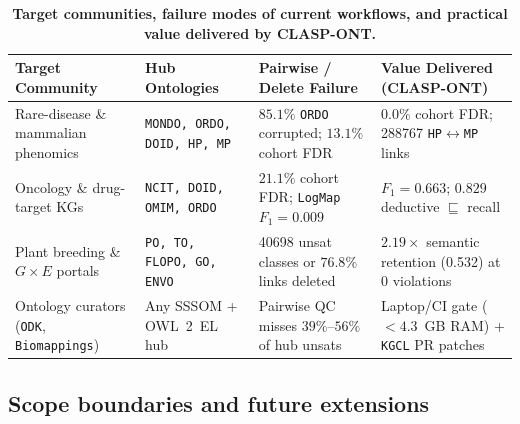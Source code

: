 \documentclass[10pt]{article}
\theoremstyle{accentdef}
\newcommand{\ClaspDiseasePhenotypeHubBRawHubORDOCorruptedPct}{85.1}
\newcommand{\ClaspDiseasePhenotypeHubBLexicalLatticeHPMPPairs}{288767}
\newcommand{\ClaspDiseasePhenotypeHubBRawHubChapterFDRPct}{13.1}
\newcommand{\ClaspOAEIBioMLBRawHubChapterFDRPct}{21.1}
\newcommand{\ClaspOAEIBioMLBLogMapRepairEquivFone}{0.009}
\newcommand{\ClaspOAEIBioMLBLexicalLatticeEquivFone}{0.663}
\newcommand{\ClaspOAEIBioMLBLexicalLatticeDedSubRecall}{0.829}
\newcommand{\ClaspPlantBiodivHubRawUnsat}{40698}
\newcommand{\ClaspPlantBiodivHubBLexicalLatticeRetention}{0.532}
\begin{document}
\begin{table}[t]
\centering
\caption{\textbf{Target communities, failure modes of current workflows, and practical value delivered by \textsc{CLASP-ONT}.}}
\label{tab:stakeholders}
\footnotesize
\setlength{\tabcolsep}{4.8pt}
\begin{tabularx}{\textwidth}{@{}>{\raggedright\arraybackslash}p{3.4cm}>{\raggedright\arraybackslash}p{2.9cm}>{\raggedright\arraybackslash}X>{\raggedright\arraybackslash}X@{}}
\toprule
\textbf{Target Community} & \textbf{Hub Ontologies} & \textbf{Pairwise / Delete Failure} & \textbf{Value Delivered (\textsc{CLASP-ONT})} \\
\midrule
Rare-disease \& mammalian phenomics & \texttt{MONDO, ORDO, DOID, HP, MP} & $\ClaspDiseasePhenotypeHubBRawHubORDOCorruptedPct{}\%$ \texttt{ORDO} corrupted; $\ClaspDiseasePhenotypeHubBRawHubChapterFDRPct{}\%$ cohort FDR & $0.0\%$ cohort FDR; \num{\ClaspDiseasePhenotypeHubBLexicalLatticeHPMPPairs} \texttt{HP}$\leftrightarrow$\texttt{MP} links \\
\addlinespace[2.5pt]
Oncology \& drug-target KGs & \texttt{NCIT, DOID, OMIM, ORDO} & $\ClaspOAEIBioMLBRawHubChapterFDRPct{}\%$ cohort FDR; \texttt{LogMap} $F_1 = \ClaspOAEIBioMLBLogMapRepairEquivFone{}$ & $F_1 = \ClaspOAEIBioMLBLexicalLatticeEquivFone{}$; $\ClaspOAEIBioMLBLexicalLatticeDedSubRecall{}$ deductive $\sqsubseteq$ recall \\
\addlinespace[2.5pt]
Plant breeding \& $G \times E$ portals & \texttt{PO, TO, FLOPO, GO, ENVO} & \num{\ClaspPlantBiodivHubRawUnsat} unsat classes or $76.8\%$ links deleted & $2.19\times$ semantic retention (\ClaspPlantBiodivHubBLexicalLatticeRetention{}) at $0$ violations \\
\addlinespace[2.5pt]
Ontology curators (\texttt{ODK}, \texttt{Biomappings}) & Any SSSOM + OWL~2~EL hub & Pairwise QC misses $39\%\text{--}56\%$ of hub unsats & Laptop/CI gate ($<4.3$~GB RAM) + \texttt{KGCL} PR patches \\
\bottomrule
\end{tabularx}
\end{table}

\subsection*{Scope boundaries and future extensions}
\end{document}
